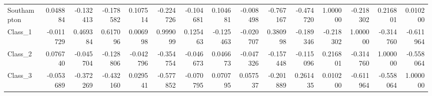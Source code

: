 \begin{tabular}{lrrrrrrrrrrrrrr}
Southampton &     0.048884 & -0.132413 & -0.178582 &     0.107514 &  -0.224726 & -0.104681 &  0.104681 &    -0.008498 &  -0.767167 &   -0.474720 &     1.000000 & -0.218302 &  0.216801 &  0.010200 \\
Class\_1     &    -0.011729 &  0.469384 &  0.617096 &     0.006998 &   0.999099 &  0.125463 & -0.125463 &    -0.020707 &   0.380998 &   -0.189346 &    -0.218302 &  1.000000 & -0.314760 & -0.611964 \\
Class\_2     &     0.076740 & -0.045704 & -0.128806 &    -0.042796 &  -0.354754 & -0.046673 &  0.046673 &    -0.047326 &  -0.157448 &   -0.115096 &     0.216801 & -0.314760 &  1.000000 & -0.558064 \\
Class\_3     &    -0.053689 & -0.372269 & -0.432160 &     0.029541 &  -0.577852 & -0.070795 &  0.070795 &     0.057537 &  -0.201889 &    0.261435 &     0.010200 & -0.611964 & -0.558064 &  1.000000 \\
\bottomrule
\end{tabular}
